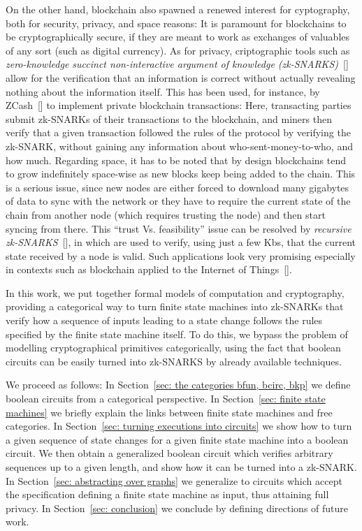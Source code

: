 \documentclass[submission,copyright,creativecommons,sharealike,noncommercial]{eptcs}
\begin{document}
On the other hand, blockchain also spawned a renewed interest for 
cyptography, both for security, privacy, and space reasons: It is 
paramount for blockchains to be cryptographically secure, if they are 
meant to work as exchanges of valuables of any sort (such as digital currency).
As for privacy, criptographic tools such as \emph{zero-knowledge 
succinct non-interactive argument of knowledge (zk-SNARKS)}~[] allow for 
the verification that an information is correct without actually revealing nothing 
about the information itself. This has been used, for instance, by ZCash~[] to 
implement private blockchain transactions: Here, transacting parties submit 
zk-SNARKs of their transactions to the blockchain, and miners then verify that a given 
transaction followed the rules of the protocol by verifying the zk-SNARK, 
without gaining any information about who-sent-money-to-who, and 
how much. 
Regarding space, it has to be noted that by design blockchains tend to 
grow indefinitely space-wise as new blocks keep being added to the chain. 
This is a serious issue, since new nodes are either forced to download many 
gigabytes of data to sync with the network or they have to require the current state 
of the chain from another node (which requires trusting the node) and then start 
syncing from there. This ``trust Vs. feasibility'' issue can be resolved by \emph{recursive 
zk-SNARKS}~[], in which are used to verify, using just a few Kbs, that the current 
state received by a node is valid. Such applications look very promising especially in 
contexts such as blockchain applied to the Internet of Things~[].

In this work, we put together formal models of computation and 
cryptography, providing a categorical way to turn finite state machines into zk-SNARKs 
that verify how a sequence of inputs leading to a state change follows the 
rules specified by the finite state machine itself. To do this, we bypass the problem 
of modelling cryptographical primitives categorically, using the 
fact that boolean circuits can be easily turned into zk-SNARKS by already 
available techniques. 

We proceed as follows: In Section~\ref{sec: the categories bfun, bcirc, bkp} we 
define boolean circuits from a categorical perspective. 
In Section~\ref{sec: finite state machines} we briefly 
explain the links between finite state machines and free categories. 
In Section~\ref{sec: turning executions into circuits} 
we show how to turn a given sequence of state changes 
for a given finite state machine into a boolean circuit. We then obtain a 
generalized boolean circuit which verifies arbitrary sequences up to 
a given length, and show how it can be turned into a zk-SNARK. 
In Section~\ref{sec: abstracting over graphs} we generalize to 
circuits which accept the specification defining a finite state machine 
as input, thus attaining full privacy. In Section~\ref{sec: conclusion} 
we conclude by defining directions of future work.
\end{document}
